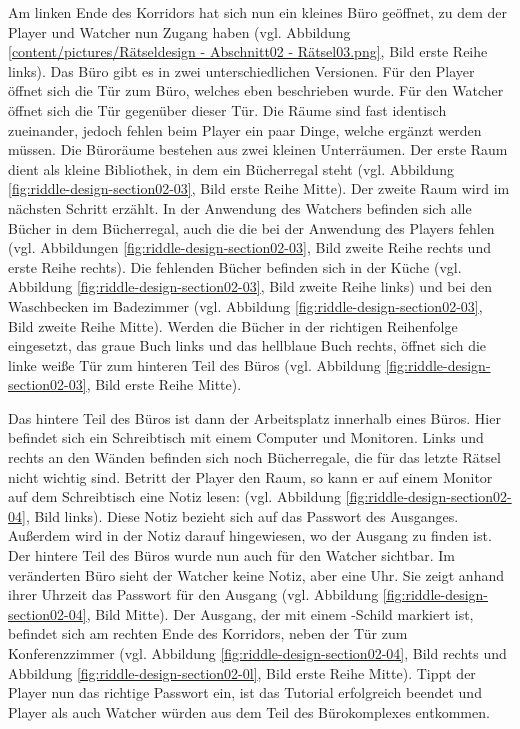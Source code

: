 Am linken Ende des Korridors hat sich nun ein kleines Büro geöffnet, zu dem der Player und Watcher nun Zugang haben (vgl. Abbildung \ref{content/pictures/Rätseldesign - Abschnitt02 - Rätsel03.png}, Bild erste Reihe links). Das Büro gibt es in zwei unterschiedlichen Versionen. Für den Player öffnet sich die Tür zum Büro, welches eben beschrieben wurde. Für den Watcher öffnet sich die Tür gegenüber dieser Tür. Die Räume sind fast identisch zueinander, jedoch fehlen beim Player ein paar Dinge, welche ergänzt werden müssen. Die Büroräume bestehen aus zwei kleinen Unterräumen. Der erste Raum dient als kleine Bibliothek, in dem ein Bücherregal steht (vgl. Abbildung \ref{fig:riddle-design-section02-03}, Bild erste Reihe Mitte). Der zweite Raum wird im nächsten Schritt erzählt. In der Anwendung des Watchers befinden sich alle Bücher in dem Bücherregal, auch die die bei der Anwendung des Players fehlen (vgl. Abbildungen \ref{fig:riddle-design-section02-03}, Bild zweite Reihe rechts und erste Reihe rechts). Die fehlenden Bücher befinden sich in der Küche (vgl. Abbildung \ref{fig:riddle-design-section02-03}, Bild zweite Reihe links) und bei den Waschbecken im Badezimmer (vgl. Abbildung \ref{fig:riddle-design-section02-03}, Bild zweite Reihe Mitte). Werden die Bücher in der richtigen Reihenfolge eingesetzt, das graue Buch links und das hellblaue Buch rechts, öffnet sich die linke weiße Tür zum hinteren Teil des Büros (vgl. Abbildung \ref{fig:riddle-design-section02-03}, Bild erste Reihe Mitte).

Das hintere Teil des Büros ist dann der Arbeitsplatz innerhalb eines Büros. Hier befindet sich ein Schreibtisch mit einem Computer und Monitoren. Links und rechts an den Wänden befinden sich noch Bücherregale, die für das letzte Rätsel nicht wichtig sind. Betritt der Player den Raum, so kann er auf einem Monitor auf dem Schreibtisch eine Notiz lesen:  (vgl. Abbildung \ref{fig:riddle-design-section02-04}, Bild links). Diese Notiz bezieht sich auf das Passwort des Ausganges. Außerdem wird in der Notiz darauf hingewiesen, wo der Ausgang zu finden ist.
Der hintere Teil des Büros wurde nun auch für den Watcher sichtbar. Im veränderten Büro sieht der Watcher keine Notiz, aber eine Uhr. Sie zeigt anhand ihrer Uhrzeit das Passwort für den Ausgang (vgl. Abbildung \ref{fig:riddle-design-section02-04}, Bild Mitte). Der Ausgang, der mit einem -Schild markiert ist, befindet sich am rechten Ende des Korridors, neben der Tür zum Konferenzzimmer (vgl. Abbildung \ref{fig:riddle-design-section02-04}, Bild rechts und Abbildung \ref{fig:riddle-design-section02-0l}, Bild erste Reihe Mitte). Tippt der Player nun das richtige Passwort ein, ist das Tutorial erfolgreich beendet und Player als auch Watcher würden aus dem Teil des Bürokomplexes entkommen.


